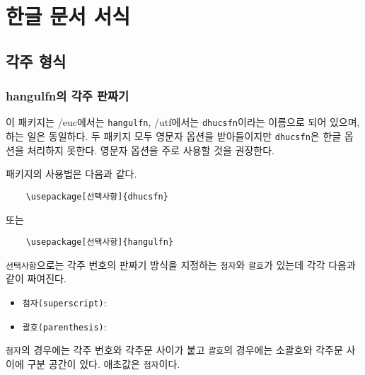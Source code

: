 \chapter{한글 문서 서식}

\section{각주 형식}\label{sec:fn}

\subsection{hangulfn의 각주 판짜기}

이 패키지는 \kotex/euc에서는 \texttt{hangulfn}, \kotex/utf에서는
\texttt{dhucsfn}이라는 이름으로 되어 있으며, 하는 일은 동일하다.
두 패키지 모두 영문자 옵션을 받아들이지만 \texttt{dhucsfn}은
한글 옵션을 처리하지 못한다. 영문자 옵션을 주로 사용할 것을 권장한다.

패키지의 사용법은 다음과 같다.
\begin{verbatim}
    \usepackage[선택사항]{dhucsfn}
\end{verbatim}
또는
\begin{verbatim}
    \usepackage[선택사항]{hangulfn}
\end{verbatim}

\texttt{선택사항}으로는 각주 번호의 판짜기 방식을 지정하는
\texttt{첨자}와 \texttt{괄호}가 있는데 각각 다음과 같이 짜여진다.
\begin{itemize}
\item \texttt{첨자(superscript)}: 
\item \texttt{괄호(parenthesis)}: 
\end{itemize}
\texttt{첨자}의 경우에는 각주 번호와 각주문 사이가 붙고
\texttt{괄호}의 경우에는 소괄호와 각주문 사이에 구분 공간이 있다.
애초값은 \texttt{첨자}이다.

